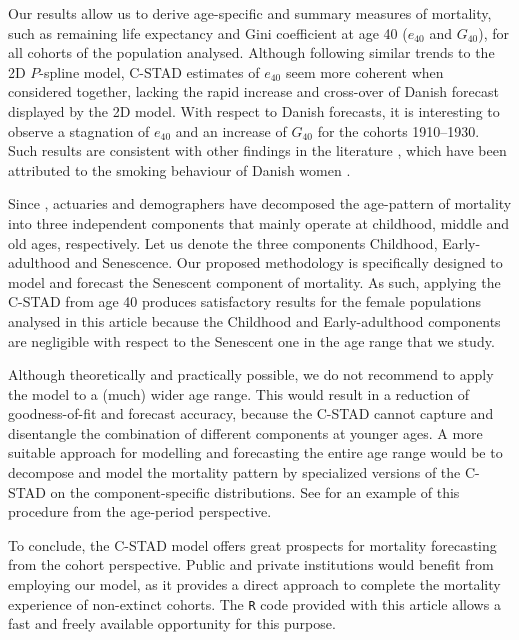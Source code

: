 \documentclass[11pt, a4paper]{article}
\begin{document}
Our results allow us to derive age-specific and summary measures of mortality, such as remaining life expectancy and Gini coefficient at age 40 ($e_{40}$ and $G_{40}$), for all cohorts of the population analysed. Although following similar trends to the 2D $P$-spline model, C-STAD estimates of $e_{40}$ seem more coherent when considered together, lacking the rapid increase and cross-over of Danish forecast displayed by the 2D model. With respect to Danish forecasts, it is interesting to observe a stagnation of $e_{40}$ and an increase of $G_{40}$ for the cohorts 1910--1930. Such results are consistent with other findings in the literature \cite[see, e.g., Fig.~4 in][]{jacobsen2002long}, which have been attributed to the smoking behaviour of Danish women \citep{jacobsen2006causes,lindahl2016did}. 

{\color{red}
Since \cite{thiele1871mathematical}, actuaries and demographers have decomposed the age-pattern of mortality into three independent components that mainly operate at childhood, middle and old ages, respectively. Let us denote the three components Childhood, Early-adulthood and Senescence. Our proposed methodology is specifically designed to model and forecast the Senescent component of mortality. As such, applying the C-STAD from age 40 produces satisfactory results for the female populations analysed in this article because the Childhood and Early-adulthood components are negligible with respect to the Senescent one in the age range that we study. 
	
Although theoretically and practically possible, we do not recommend to apply the model to a (much) wider age range. This would result in a reduction of goodness-of-fit and forecast accuracy, because the C-STAD cannot capture and disentangle the combination of different components at younger ages. A more suitable approach for modelling and forecasting the entire age range would be to decompose and model the mortality pattern by specialized versions of the C-STAD on the component-specific distributions. See \cite{basellini2019three} for an example of this procedure from the age-period perspective. \par
}

To conclude, the C-STAD model offers great prospects for mortality forecasting from the cohort perspective. {\color{red}Public and private institutions would benefit from employing our model, as it} provides a direct approach to complete the mortality experience  of non-extinct cohorts. The \texttt{R} code provided with this article allows a fast and freely available opportunity for this purpose. 
\end{document}
